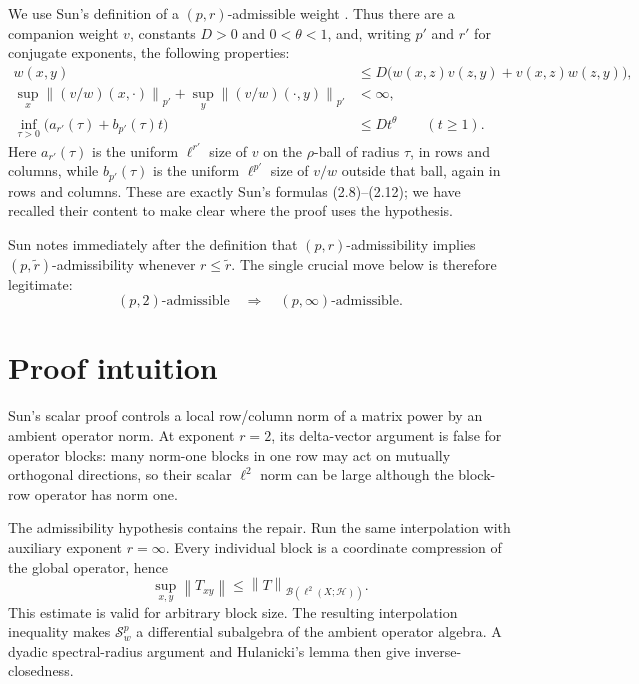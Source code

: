 \documentclass[11pt]{article}
\newcommand{\Spw}{\mathcal S^p_w}
\newcommand{\norm}[1]{\left\lVert #1\right\rVert}
\begin{document}
We use Sun's definition of a $(p,r)$-admissible weight
\cite[Definition in Section 2.2]{Sun}.  Thus there are a companion weight
$v$, constants $D>0$ and $0<\theta<1$, and, writing $p'$ and $r'$ for
conjugate exponents, the following properties:
\begin{align}
 w(x,y)&\le D\bigl(w(x,z)v(z,y)+v(x,z)w(z,y)\bigr),
                                                        \label{eq:weight-product}\\
 \sup_x\norm{(v/w)(x,\cdot)}_{p'}
 +\sup_y\norm{(v/w)(\cdot,y)}_{p'}&<\infty,             \label{eq:embedding-weight}\\
 \inf_{\tau>0}\bigl(a_{r'}(\tau)+b_{p'}(\tau)t\bigr)
 &\le D t^\theta\qquad(t\ge1).                         \label{eq:interpolation-weight}
\end{align}
Here $a_{r'}(\tau)$ is the uniform $\ell^{r'}$ size of $v$ on the
$\rho$-ball of radius $\tau$, in rows and columns, while $b_{p'}(\tau)$ is
the uniform $\ell^{p'}$ size of $v/w$ outside that ball, again in rows and
columns.  These are exactly Sun's formulas (2.8)--(2.12); we have recalled
their content to make clear where the proof uses the hypothesis.

Sun notes immediately after the definition that $(p,r)$-admissibility
implies $(p,\widetilde r)$-admissibility whenever $r\le\widetilde r$.  The
single crucial move below is therefore legitimate:
\begin{equation}
        (p,2)\text{-admissible}\quad\Longrightarrow\quad
        (p,\infty)\text{-admissible}.
                                                        \label{eq:move-r}
\end{equation}

\section*{Proof intuition}

Sun's scalar proof controls a local row/column norm of a matrix power by an
ambient operator norm.  At exponent $r=2$, its delta-vector argument is false
for operator blocks: many norm-one blocks in one row may act on mutually
orthogonal directions, so their scalar $\ell^2$ norm can be large although
the block-row operator has norm one.

The admissibility hypothesis contains the repair.  Run the same interpolation
with auxiliary exponent $r=\infty$.  Every individual block is a coordinate
compression of the global operator, hence
\[
        \sup_{x,y}\norm{T_{xy}}
        \le \norm{T}_{\mathcal B(\ell^2(X;\mathcal H))}.
\]
This estimate is valid for arbitrary block size.  The resulting
interpolation inequality makes $\Spw$ a differential subalgebra of the
ambient operator algebra.  A dyadic spectral-radius argument and Hulanicki's
lemma then give inverse-closedness.
\end{document}
